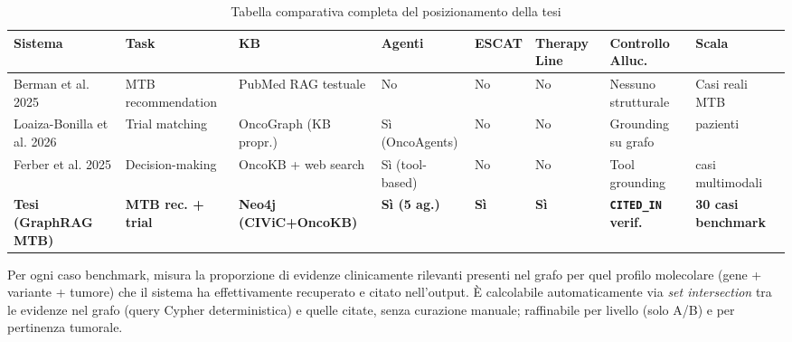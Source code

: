 \documentclass[11pt,a4paper]{article}
\renewcommand{\arraystretch}{1.25}
\newcommand{\code}[1]{\texttt{\small #1}}
\begin{document}
\begin{table}[htbp]
\centering
\scriptsize
\renewcommand{\arraystretch}{1.4}
\caption{Tabella comparativa completa del posizionamento della tesi}
\label{tab:comparison_sota}
\begin{tabularx}{\textwidth}{
  >{\raggedright\arraybackslash}p{2.2cm} 
  >{\raggedright\arraybackslash}X 
  >{\raggedright\arraybackslash}X 
  >{\centering\arraybackslash}p{1.2cm} 
  >{\centering\arraybackslash}p{1.2cm} 
  >{\centering\arraybackslash}p{1.4cm} 
  >{\raggedright\arraybackslash}X 
  >{\raggedright\arraybackslash}p{1.8cm}
}
\toprule
\rowcolor{primary}
\color{white}\textbf{Sistema} & \color{white}\textbf{Task} & \color{white}\textbf{KB} & \color{white}\textbf{Agenti} & \color{white}\textbf{ESCAT} & \color{white}\textbf{Therapy Line} & \color{white}\textbf{Controllo Alluc.} & \color{white}\textbf{Scala} \\
\midrule
Berman et al. 2025 & MTB recommendation & PubMed RAG testuale & No & No & No & Nessuno strutturale & Casi reali MTB \\
\rowcolor{roweven}
Loaiza-Bonilla et al. 2026 & Trial matching & OncoGraph (KB propr.) & S\`i (OncoAgents) & No & No & Grounding su grafo & 3.804 pazienti \\
Ferber et al. 2025 & Decision-making & OncoKB + web search & S\`i (tool-based) & No & No & Tool grounding & 20 casi multimodali \\
\rowcolor{roweven}
\textbf{Tesi (GraphRAG MTB)} & \textbf{MTB rec. + trial} & \textbf{Neo4j (CIViC+OncoKB)} & \textbf{S\`i (5 ag.)} & \textbf{S\`i} & \textbf{S\`i} & \textbf{\code{CITED\_IN} verif.} & \textbf{30 casi benchmark} \\
\bottomrule
\end{tabularx}
\end{table}

\begin{defbox}\label{sec:eg}
Per ogni caso benchmark, misura la proporzione di evidenze clinicamente rilevanti presenti nel grafo per quel profilo molecolare (gene + variante + tumore) che il sistema ha effettivamente recuperato e citato nell'output. \`E calcolabile automaticamente via \emph{set intersection} tra le evidenze nel grafo (query Cypher deterministica) e quelle citate, senza curazione manuale; raffinabile per livello (solo A/B) e per pertinenza tumorale.
\end{defbox}
\end{document}
